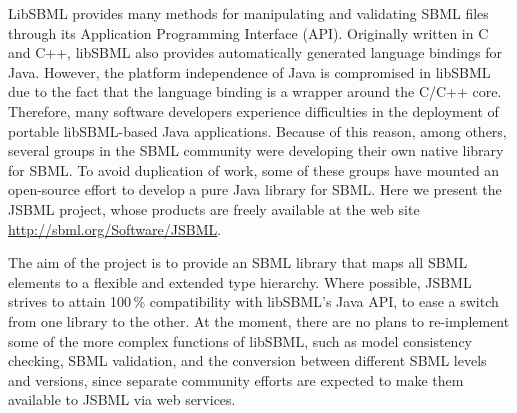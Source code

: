 \documentclass{bioinfo}
\begin{document}
LibSBML provides many methods for manipulating and validating
SBML files through its Application Programming Interface (API).
Originally written in C and C++, libSBML also provides automatically generated
language bindings for Java\texttrademark.
However, the platform independence of Java is compromised
in libSBML due to the fact that the language binding is a
wrapper around the C/C++ core.
Therefore, many software developers experience difficulties in
the deployment of portable libSBML-based Java applications.
Because of this reason, among others, several groups in the SBML community
were developing their own native library for SBML. To avoid duplication of
work, some of these groups have mounted an open-source effort to
develop a pure Java library for SBML. Here we present the JSBML
project, whose products are freely available at the web site
\href{http://sbml.org/Software/JSBML}{http://sbml.org/Software/JSBML}.

The aim of the project is to provide an SBML
library that maps all SBML elements to a flexible and extended
type hierarchy. Where possible, JSBML strives to attain
100\,\% compatibility with libSBML's Java API, to ease a switch from
one library to the other. At the moment, there are no plans to re-implement some
of the more complex functions of libSBML, such as model consistency checking,
SBML validation, and the conversion between different SBML levels and versions,
since separate community efforts are expected to make them
available to JSBML via web services.

\end{document}
